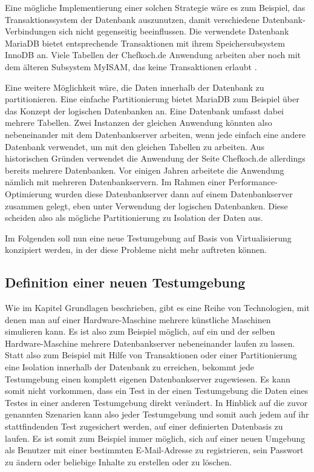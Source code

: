 Eine mögliche Implementierung einer solchen Strategie wäre es zum Beispiel, das Transaktionssystem der Datenbank auszunutzen, damit verschiedene Datenbank-Verbindungen sich nicht gegenseitig beeinflussen. Die verwendete Datenbank MariaDB bietet entsprechende Transaktionen mit ihrem Speichersubsystem InnoDB an. Viele Tabellen der Chefkoch.de Anwendung arbeiten aber noch mit dem älteren Subsystem MyISAM, das keine Transaktionen erlaubt \citep[Vgl.][]{rackspace}.

Eine weitere Möglichkeit wäre, die Daten innerhalb der Datenbank zu partitionieren. Eine einfache Partitionierung bietet MariaDB zum Beispiel über das Konzept der logischen Datenbanken an. Eine Datenbank umfasst dabei mehrere Tabellen. Zwei Instanzen der gleichen Anwendung könnten also nebeneinander mit dem Datenbankserver arbeiten, wenn jede einfach eine andere Datenbank verwendet, um mit den gleichen Tabellen zu arbeiten. Aus historischen Gründen verwendet die Anwendung der Seite Chefkoch.de allerdings bereits mehrere Datenbanken. Vor einigen Jahren arbeitete die Anwendung nämlich mit mehreren Datenbankservern. Im Rahmen einer Performance-Optimierung wurden diese Datenbankserver dann auf einem Datenbankserver zusammen gelegt, eben unter Verwendung der logischen Datenbanken. Diese scheiden also als mögliche Partitionierung zu Isolation der Daten aus.

Im Folgenden soll nun eine neue Testumgebung auf Basis von Virtualisierung konzipiert werden, in der diese Probleme nicht mehr auftreten können.

\subsection{Definition einer neuen Testumgebung}

Wie im Kapitel Grundlagen beschrieben, gibt es eine Reihe von Technologien, mit denen man auf einer Hardware-Maschine mehrere künstliche Maschinen simulieren kann. Es ist also zum Beispiel möglich, auf ein und der selben Hardware-Maschine mehrere Datenbankserver nebeneinander laufen zu lassen. Statt also zum Beispiel mit Hilfe von Transaktionen oder einer Partitionierung eine Isolation innerhalb der Datenbank zu erreichen, bekommt jede Testumgebung einen komplett eigenen Datenbankserver zugewiesen. Es kann somit nicht vorkommen, dass ein Test in der einen Testumgebung die Daten eines Testes in einer anderen Testumgebung direkt verändert. In Hinblick auf die zuvor genannten Szenarien kann also jeder Testumgebung und somit auch jedem auf ihr stattfindenden Test zugesichert werden, auf einer definierten Datenbasis zu laufen. Es ist somit zum Beispiel immer möglich, sich auf einer neuen Umgebung als Benutzer mit einer bestimmten E-Mail-Adresse zu registrieren, sein Passwort zu ändern oder beliebige Inhalte zu erstellen oder zu löschen.

